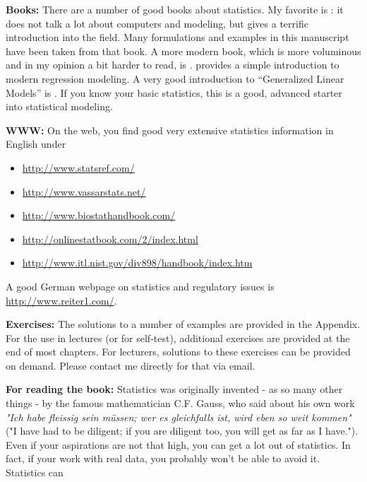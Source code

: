 \textbf{Books: }There are a number of good books about statistics. My favorite is \cite{altman99}: it does not talk a lot about computers and modeling, but gives a terrific introduction into the field. Many formulations and examples in this manuscript have been taken from that book. A more modern book, which is more voluminous and in my opinion a bit harder to read, is \cite{Riffenburgh2012}. \cite{Kaplan2009} provides a simple introduction to modern regression modeling. A very good introduction to “Generalized Linear Models” is \cite{Dobson2008}. If you know your basic statistics, this is a good, advanced starter into statistical modeling.

\vspace{5 mm}

\textbf{WWW: }On the web, you find good very extensive statistics information in English under
\begin{itemize}
    \item \url{http://www.statsref.com/}
    \item \url{http://www.vassarstats.net/}
    \item \url{http://www.biostathandbook.com/}
    \item \url{http://onlinestatbook.com/2/index.html}
    \item \url{http://www.itl.nist.gov/div898/handbook/index.htm}
\end{itemize}

 A good German webpage on statistics and regulatory issues is \url{http://www.reiter1.com/}.

\vspace{5 mm}

\textbf{Exercises: }The solutions to a number of examples are provided in the Appendix. For the use in lectures (or for self-test), additional exercises are provided at the end of most chapters. For lecturers, solutions to these exercises can be provided on demand. Please contact me directly for that via email.

\textbf{For reading the book: }Statistics was originally invented - as so many other things - by the famous mathematician C.F. Gauss, who said about his own work \emph{"Ich habe fleissig sein m\"ussen; wer es gleichfalls ist, wird eben so weit kommen"} ("I have had to be diligent; if you are diligent too, you will get as far as I have."). Even if your aspirations are not that high, you can get a lot out of statistics. In fact, if your work with real data, you probably won't be able to avoid it. Statistics can

